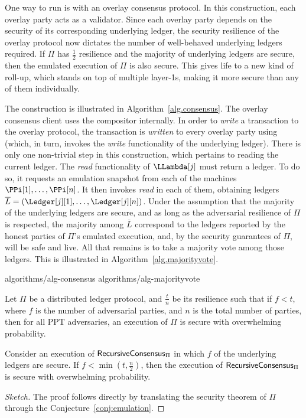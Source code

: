 \label{sec:consensus}

One way to run \rollerblade is with an overlay consensus protocol.
In this construction, each overlay party acts as a validator.
Since each overlay party depends on the security of its
corresponding underlying ledger, the security resilience
of the overlay protocol now dictates the number of well-behaved
underlying ledgers required.
If $\Pi$ has $\frac{1}{2}$ resilience and the majority of underlying
ledgers are secure, then the emulated execution of $\Pi$ is also secure.
This gives life to a new kind of roll-up, which stands on top of multiple
layer-1s, making it more secure than any of them individually.

The construction is illustrated in Algorithm~\ref{alg.consensus}. The
overlay consensus client uses the \rollerblade compositor internally.
In order to \emph{write} a transaction to the overlay protocol, the
transaction is \emph{written} to every overlay party using \writeToMachine
(which, in turn, invokes the \emph{write} functionality of the underlying ledger).
There is only one non-trivial step in this construction, which pertains
to reading the current ledger. The \emph{read} functionality
of $\LLambda[j]$ must return a ledger. To do so, it requests an emulation snapshot from
each of the machines $\PPi[1], \ldots, \PPi[n]$. It then invokes \emph{read}
in each of them, obtaining ledgers $\overline{L} = (\Ledger[j][1], \ldots, \Ledger[j][n])$.
Under the assumption that the majority of the underlying ledgers are secure,
and as long as the adversarial resilience of $\Pi$ is respected, the
majority among $\overline{L}$ correspond to the ledgers reported by the
honest parties of $\Pi$'s emulated execution, and, by the security guarantees
of $\Pi$, will be safe and live. All that remains is to take a majority vote
among those ledgers. This is illustrated in Algorithm~\ref{alg.majorityvote}.

{algorithms/alg-consensus}
{algorithms/alg-majorityvote}

\begin{theorem}[Security]
  Let $\Pi$ be a distributed ledger protocol, and $\frac{t}{n}$ be its resilience such
  that if $f < t$, where $f$ is the number of adversarial parties, and $n$ is the total number of parties,
  then for all PPT adversaries, an execution of $\Pi$ is secure with overwhelming probability.

  Consider an execution of $\textsf{RecursiveConsensus}_{\Pi}$ in which $f$ of the underlying
  ledgers are secure. If $f < \min(t, \frac{n}{2})$, then the execution of $\textsf{RecursiveConsensus}_{\Pi}$
  is secure with overwhelming probability.
\end{theorem}
\begin{proof}[Sketch]
  The proof follows directly by translating the security theorem of $\Pi$ through
  the Conjecture~\ref{conj:emulation}.
  \Qed
\end{proof}

